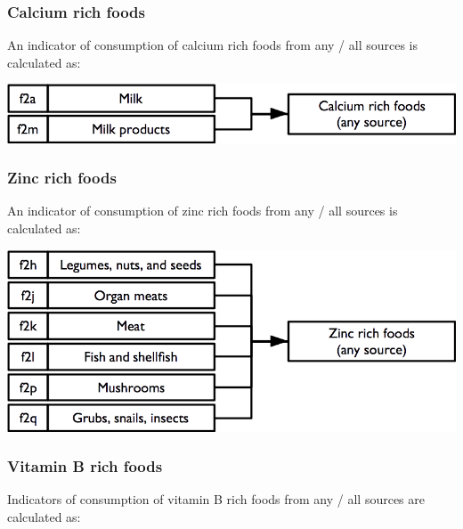 \documentclass[12pt,a4paper]{book}
\theoremstyle{definition}
\theoremstyle{definition}
\theoremstyle{definition}
\theoremstyle{remark}
\begin{document}
\hypertarget{calcium-rich-foods}{%
\subsubsection{Calcium rich foods}\label{calcium-rich-foods}}

An indicator of consumption of calcium rich foods from any / all sources
is calculated as:

\begin{center}\includegraphics[width=800pt]{figures/indicators12} \end{center}

\hypertarget{zinc-rich-foods}{%
\subsubsection{Zinc rich foods}\label{zinc-rich-foods}}

An indicator of consumption of zinc rich foods from any / all sources is
calculated as:

\begin{center}\includegraphics[width=800pt]{figures/indicators13} \end{center}

\hypertarget{vitamin-b-rich-foods}{%
\subsubsection{Vitamin B rich foods}\label{vitamin-b-rich-foods}}

Indicators of consumption of vitamin B rich foods from any / all sources
are calculated as:
\end{document}
